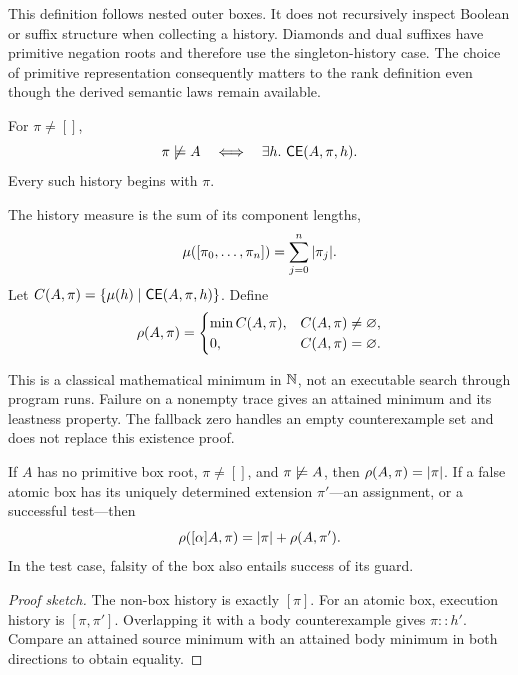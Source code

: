 This definition follows nested outer boxes. It does not recursively inspect
Boolean or suffix structure when collecting a history. Diamonds and dual
suffixes have primitive negation roots and therefore use the singleton-history
case. The choice of primitive representation consequently matters to the
rank definition even though the derived semantic laws remain available.

\begin{lemma}
For $\pi\ne[]$,
\[
 \pi\not\models A\quad\Longleftrightarrow\quad\exists h.\ \mathsf{CE}(A,\pi,h).
\]
Every such history begins with $\pi$.
\end{lemma}

\begin{definition}
The history measure is the sum of its component lengths,
\[
 \mu([\pi_0,\ldots,\pi_n])=\sum_{j=0}^{n}|\pi_j|.
\]
Let $C(A,\pi)=\{\mu(h)\mid\mathsf{CE}(A,\pi,h)\}$. Define
\[
 \rho(A,\pi)=\begin{cases}
 \min C(A,\pi),&C(A,\pi)\ne\varnothing,\\
 0,&C(A,\pi)=\varnothing.
 \end{cases}
\]
\end{definition}

This is a classical mathematical minimum in $\mathbb{N}$, not an executable search
through program runs. Failure on a nonempty trace gives an attained minimum
and its leastness property. The fallback zero handles an empty counterexample
set and does not replace this existence proof.

\begin{lemma}
If $A$ has no primitive box root, $\pi\ne[]$, and $\pi\not\models A$, then
$\rho(A,\pi)=|\pi|$.
If a false atomic box has its uniquely determined extension $\pi'$---an
assignment, or a successful test---then
\[
 \rho([\alpha]A,\pi)=|\pi|+\rho(A,\pi').
\]
In the test case, falsity of the box also entails success of its guard.
\end{lemma}

\begin{proof}[Proof sketch]
The non-box history is exactly $[\pi]$. For an atomic box, execution history
is $[\pi,\pi']$. Overlapping it with a body counterexample gives
$\pi::h'$. Compare an attained source minimum with an attained body minimum
in both directions to obtain equality.
\end{proof}

